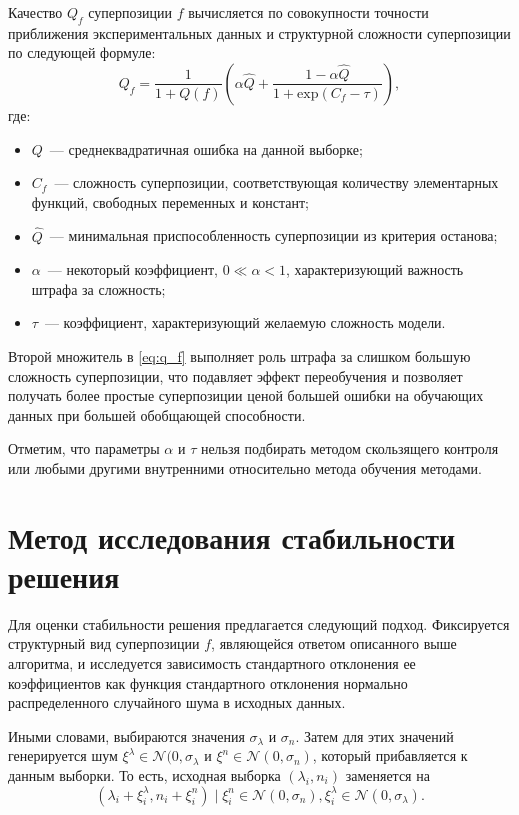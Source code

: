 \documentclass[12pt,a4paper]{article}
\begin{document}
Качество $Q_f$ суперпозиции $f$ вычисляется по совокупности точности приближения
экспериментальных данных и структурной сложности суперпозиции по следующей формуле:
\begin{equation}
  \label{eq:q_f}
  Q_f = \frac{1}{1 + Q(f)} \left(\alpha \hat{Q} + \frac{1 - \alpha \hat{Q}}{1 + \text{exp} (C_f - \tau)}\right),
\end{equation}
где:
\begin{itemize}
  \item $Q$~--- среднеквадратичная ошибка на данной выборке;
  \item $C_f$~--- сложность суперпозиции, соответствующая количеству элементарных
	функций, свободных переменных и констант;
  \item $\hat{Q}$~--- минимальная приспособленность суперпозиции из критерия
	останова;
  \item $\alpha$~--- некоторый коэффициент, $0 \ll \alpha < 1$, характеризующий
	важность штрафа за сложность;
  \item $\tau$~--- коэффициент, характеризующий желаемую сложность модели.
\end{itemize}

Второй множитель в \eqref{eq:q_f} выполняет роль штрафа за слишком
большую сложность суперпозиции, что подавляет эффект переобучения и позволяет
получать более простые суперпозиции ценой большей ошибки на обучающих данных
при большей обобщающей способности.

Отметим, что параметры $\alpha$ и $\tau$ нельзя подбирать методом скользящего
контроля или любыми другими внутренними относительно метода обучения методами.

\section{Метод исследования стабильности решения}

Для оценки стабильности решения предлагается следующий подход. Фиксируется структурный вид суперпозиции $f$,
являющейся ответом описанного выше алгоритма, и исследуется
зависимость стандартного отклонения ее коэффициентов как функция стандартного отклонения
нормально распределенного случайного шума в исходных данных.

Иными словами, выбираются значения $\sigma_{\lambda}$ и $\sigma_n$. Затем для этих
значений генерируется шум
$\xi^{\lambda} \in \mathcal{N}(0, \sigma_{\lambda}$ и $\xi^n \in \mathcal{N}(0, \sigma_n)$,
который прибавляется к данным выборки. То есть, исходная выборка $(\lambda_i, n_i)$ заменяется на
\[
  (\lambda_i + \xi^{\lambda}_i, n_i + \xi^n_i) \mid \xi^n_i \in \mathcal{N}(0, \sigma_n), \xi^{\lambda}_i \in \mathcal{N}(0, \sigma_{\lambda}).
\]
\end{document}
